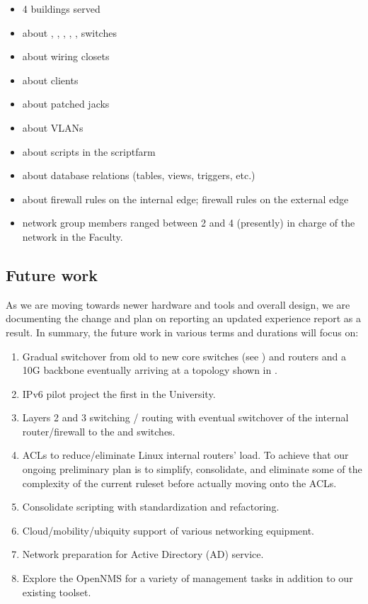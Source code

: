 \begin{itemize}
	\item 4 buildings served
 	\item about {\swTNFZ}, {\swTNXZ}, {\swTNSZ}, {\swTNTF}, {\swTFFZ}, {\swTFFE} switches
	\item about {\wclosets} wiring closets
	\item about {\netclients} clients
	\item about {\jackpatches} patched jacks
	\item about {\vlans} VLANs
	\item about {\scripts} scripts in the scriptfarm
	\item about {\dbentities} database relations (tables, views, triggers, etc.)
	\item
		about {\fwrulesIN} firewall rules on the internal edge;
		{\fwrulesEX} firewall rules on the external edge
	\item network group members ranged between 2 and 4 (presently) in charge of
		the network in the Faculty.
\end{itemize}


\subsection{Future work}


As we are moving towards newer hardware and tools
and overall design, we are documenting the change
and plan on reporting an updated experience report
as a result. In summary, the future work in various
terms and durations will focus on:

\begin{enumerate}
	\item Gradual switchover from old to new core switches
	(see )
	and routers and a 10G backbone eventually arriving at a topology shown in .
	\item IPv6 pilot project
\cite{migrating-to-ipv6-2006,theipv6experts,nist-ipv6,implementing-ipv6-cuv-2007}
	the first in the University.
	\item Layers 2 and 3 switching / routing with eventual
	switchover of the internal router/firewall to the {\cisco}  and  switches.
	\item
		{\cisco} ACLs to reduce/eliminate Linux internal routers'  load.
		To achieve that our ongoing preliminary plan is to simplify, consolidate, and eliminate
		some of the complexity of the current ruleset before actually moving onto the ACLs.
	\item Consolidate scripting with standardization and refactoring.
	\item Cloud/mobility/ubiquity support of various networking equipment.
	\item Network preparation for Active Directory (AD) service.
	\item Explore the OpenNMS \cite{opennms} for a variety of management tasks in
	addition to our existing toolset.
\end{enumerate}

